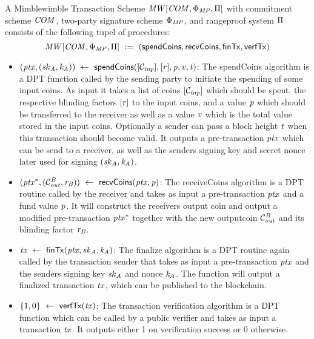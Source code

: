 \begin{definition}
    \label{def:mw-tx-scheme}
    A Mimblewimble Transaction Scheme $\mathit{MW}[\mathit{COM},\Phi_{\mathit{MP}},\Pi]$ with commitment scheme $\mathit{COM}$, two-party signature scheme $\Phi_{\mathit{MP}}$, and rangeproof system $\Pi$ consists of the following tupel of procedures:
    \[ \mathit{MW}[\mathit{COM},\Phi_{\mathit{MP}},\Pi] ~:=~ ( \mathsf{spendCoins},\mathsf{recvCoins},\mathsf{finTx},\mathsf{verfTx} ) \]
    \begin{itemize}
        \item $(\mathit{ptx}, (\mathit{sk}_{\mathit{A}}, \mathit{\mathit{k}_{\mathit{A}}})) ~\leftarrow~ \mathsf{spendCoins}([\mathcal{C}_{\mathit{inp}}],[\mathit{r}],\mathit{p},\mathit{v},\mathit{t})$: The spendCoins algorithm is a DPT function called by the sending party to initiate the spending of some input coins.
        As input it takes a list of coins $[\mathcal{C}_{\mathit{inp}}]$ which should be spent, the respective blinding factors $[\mathit{r}]$ to the input coins, and a value $\mathit{p}$ which should be transferred to the receiver as well as a value $\mathit{v}$ which is the total value stored in the input coins.
        Optionally a sender can pass a block height $\mathit{t}$ when this transaction should become valid.
        It outputs a pre-transaction $\mathit{ptx}$ which can be send to a receiver, as well as the senders signing key and secret nonce later used for signing $(\mathit{sk}_{\mathit{A}}, \mathit{\mathit{k}_{\mathit{A}}})$.
        \item $(\mathit{ptx}^*, (\mathcal{C}_{\mathit{out}}^{\mathit{B}}, \mathit{r}_{\mathit{B}})) ~\leftarrow~ \mathsf{recvCoins}(\mathit{ptx},\mathit{p})$: The receiveCoins algorithm is a DPT routine called by the receiver and takes as input a pre-transaction $\mathit{ptx}$ and a fund value
        $\mathit{p}$. It will construct the receivers output coin and output a modified pre-transaction $\mathit{ptx}^*$ together with the new outputcoin $\mathcal{C}_{\mathit{out}}^{\mathit{B}}$ and its blinding factor $\mathit{r}_{\mathit{B}}$.
        \item $\mathit{tx} ~\leftarrow~ \mathsf{finTx}(\mathit{ptx},\mathit{sk}_{\mathit{A}},\mathit{\mathit{k}_{\mathit{A}}})$: The finalize algorithm is a DPT routine again called by the transaction sender that takes as input a pre-transaction $\mathit{ptx}$ and the senders signing key $\mathit{sk}_{\mathit{A}}$ and nonce $\mathit{\mathit{k}_{\mathit{A}}}$.
        The function will output a finalized transaction $\mathit{tx}$, which can be published to the blockchain.
        \item $\{1,0\} ~\leftarrow~ \mathsf{verfTx}(\mathit{tx})$: The transaction verification algorithm is a DPT function which can be called by a public verifier and takes as input a transaction $\mathit{tx}$. It
        outputs either 1 on verification success or 0 otherwise.
    \end{itemize}
\end{definition}

